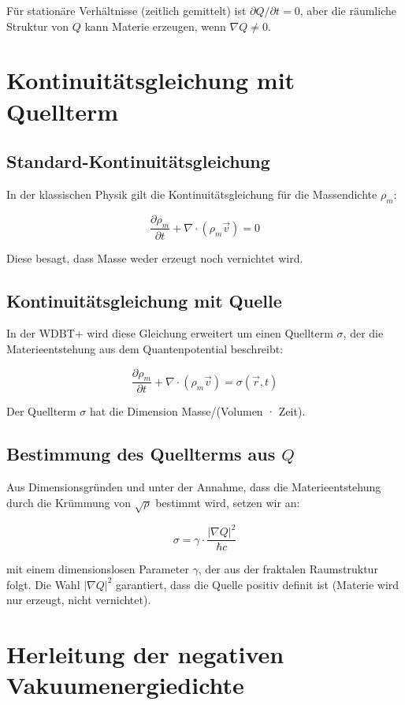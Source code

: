 Für stationäre Verhältnisse (zeitlich gemittelt) ist \( \partial Q/\partial t = 0 \), 
aber die räumliche Struktur von \( Q \) kann Materie erzeugen, wenn \( \nabla Q \neq 0 \).

\section{Kontinuitätsgleichung mit Quellterm}

\subsection{Standard-Kontinuitätsgleichung}

In der klassischen Physik gilt die Kontinuitätsgleichung für die Massendichte \( \rho_m \):

\[
\frac{\partial \rho_m}{\partial t} + \nabla \cdot (\rho_m \vec{v}) = 0
\]

Diese besagt, dass Masse weder erzeugt noch vernichtet wird.

\subsection{Kontinuitätsgleichung mit Quelle}

In der WDBT+ wird diese Gleichung erweitert um einen Quellterm \( \sigma \), der die 
Materieentstehung aus dem Quantenpotential beschreibt:

\[
\frac{\partial \rho_m}{\partial t} + \nabla \cdot (\rho_m \vec{v}) = \sigma(\vec{r}, t) \tag{J.1}
\]

Der Quellterm \( \sigma \) hat die Dimension Masse/(Volumen · Zeit).

\subsection{Bestimmung des Quellterms aus \( Q \)}

Aus Dimensionsgründen und unter der Annahme, dass die Materieentstehung durch die 
Krümmung von \( \sqrt{\rho} \) bestimmt wird, setzen wir an:

\[
\sigma = \gamma \cdot \frac{|\nabla Q|^2}{\hbar c} \tag{J.2}
\]

mit einem dimensionslosen Parameter \( \gamma \), der aus der fraktalen Raumstruktur folgt. 
Die Wahl \( |\nabla Q|^2 \) garantiert, dass die Quelle positiv definit ist 
(Materie wird nur erzeugt, nicht vernichtet).

\section{Herleitung der negativen Vakuumenergiedichte}

